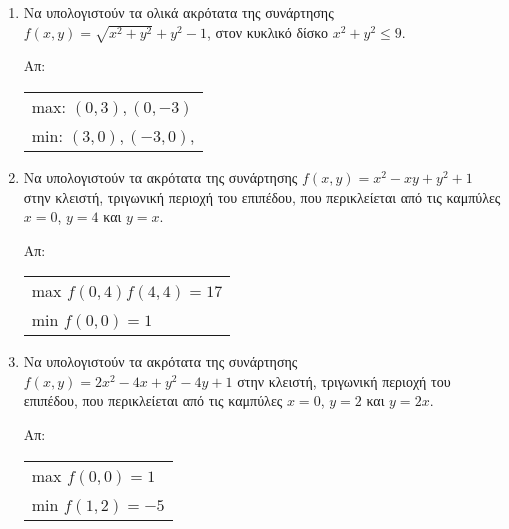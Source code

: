 \documentclass[a4paper,table]{report}
\begin{document}
\begin{enumerate}


  \item Να υπολογιστούν τα ολικά ακρότατα της συνάρτησης $ f(x,y) = \sqrt{x^{2}+y^{2}} +
    y^{2}-1 $, στον κυκλικό δίσκο $ x^{2}+y^{2} \leq 9 $. 

    \hfill Απ: 
    \begin{tabular}{l}
      max: $ (0,3), (0,-3) $ \\
      min: $ (3,0), (-3,0) $, 
    \end{tabular}

  \item Να υπολογιστούν τα ακρότατα της συνάρτησης $ f(x,y) = x^{2}-xy+y^{2}+1 $ 
    στην κλειστή, τριγωνική περιοχή του επιπέδου, που περικλείεται από τις καμπύλες 
    $ x=0 $, $ y=4 $ και $ y=x $.

    \hfill Απ:  
    \begin{tabular}{l}
      max $ f(0,4) f(4,4) = 17 $ \\
      min $ f(0,0) = 1 $ 
    \end{tabular}

  \item Να υπολογιστούν τα ακρότατα της συνάρτησης $ f(x,y) = 2x^{2}-4x+y^{2}-4y+1 $ 
    στην κλειστή, τριγωνική περιοχή του επιπέδου, που περικλείεται από τις καμπύλες 
    $ x=0 $, $ y=2 $ και $ y=2x $.

    \hfill Απ:  
    \begin{tabular}{l}
      max $ f(0,0) = 1 $ \\
      min $ f(1,2) = -5 $ 
    \end{tabular}
\end{enumerate}
\end{document}

